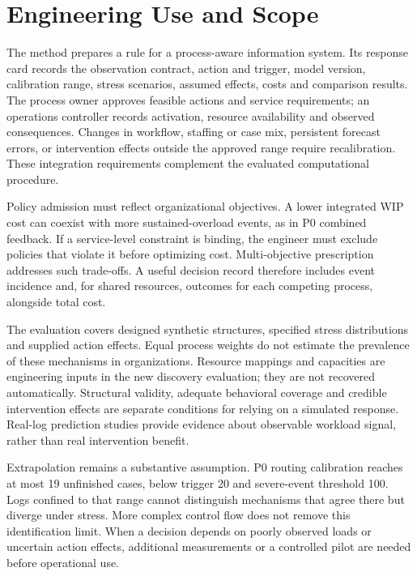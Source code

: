 \section{Engineering Use and Scope}
The method prepares a rule for a process-aware information system. Its response card records the observation contract, action and trigger, model version, calibration range, stress scenarios, assumed effects, costs and comparison results. The process owner approves feasible actions and service requirements; an operations controller records activation, resource availability and observed consequences. Changes in workflow, staffing or case mix, persistent forecast errors, or intervention effects outside the approved range require recalibration. These integration requirements complement the evaluated computational procedure.

Policy admission must reflect organizational objectives. A lower integrated WIP cost can coexist with more sustained-overload events, as in P0 combined feedback. If a service-level constraint is binding, the engineer must exclude policies that violate it before optimizing cost. Multi-objective prescription~\cite{multikpi} addresses such trade-offs. A useful decision record therefore includes event incidence and, for shared resources, outcomes for each competing process, alongside total cost.

The evaluation covers designed synthetic structures, specified stress distributions and supplied action effects. Equal process weights do not estimate the prevalence of these mechanisms in organizations. Resource mappings and capacities are engineering inputs in the new discovery evaluation; they are not recovered automatically. Structural validity, adequate behavioral coverage and credible intervention effects are separate conditions for relying on a simulated response. Real-log prediction studies provide evidence about observable workload signal, rather than real intervention benefit.

Extrapolation remains a substantive assumption. P0 routing calibration reaches at most 19 unfinished cases, below trigger 20 and severe-event threshold 100. Logs confined to that range cannot distinguish mechanisms that agree there but diverge under stress. More complex control flow does not remove this identification limit. When a decision depends on poorly observed loads or uncertain action effects, additional measurements or a controlled pilot are needed before operational use.

